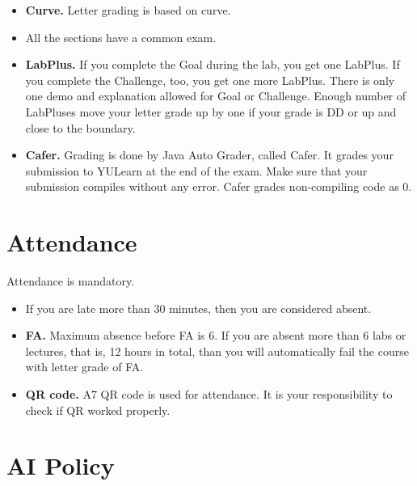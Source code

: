 \begin{itemize}
	
	\item 
	\textbf{Curve.}
	Letter grading is based on curve.
	
	\item 
	All the sections have a common exam. 

	\item 
	\textbf{LabPlus.} 
	If you complete the Goal during the lab, you get one LabPlus. 
	If you complete the Challenge, too, you get one more LabPlus. 
	There is only one demo and explanation allowed for Goal or Challenge. 
	Enough number of LabPluses move your letter grade up by one 
	if your grade is DD or up and close to the boundary. 
		
	\item 
	\textbf{Cafer.} 
	Grading is done by Java Auto Grader, called Cafer. 
	It grades your submission to YULearn at the end of the exam. 
	Make sure that your submission compiles without any error. 
	Cafer grades non-compiling code as 0.
	
\end{itemize}




\section{Attendance}

Attendance is mandatory. 
\begin{itemize}
	
	\item 
	If you are late more than 30 minutes, then you are considered absent.
	
	\item 
	\textbf{FA.}
	Maximum absence before FA is 6.	 
	If you are absent more than 6 labs or lectures, 
	that is, 12 hours in total, 
	than you will automatically fail the course with letter grade of FA.
	
	\item 	
	\textbf{QR code.}
	A7 QR code is used for attendance. 
	It is your responsibility to check 
	if QR worked properly.
	
\end{itemize}




\section{AI Policy}

